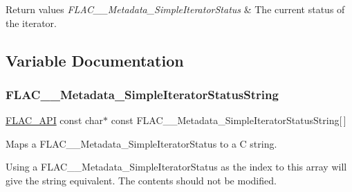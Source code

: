 \begin{DoxyRetVals}{Return values}
{\em F\+L\+A\+C\+\_\+\+\_\+\+Metadata\+\_\+\+Simple\+Iterator\+Status} & The current status of the iterator. \\
\hline
\end{DoxyRetVals}


\subsection{Variable Documentation}
\mbox{\label{group__flac__metadata__level1_ga28ea4a13fcbe97a732fafb13417036bb}} 
\subsubsection{\texorpdfstring{FLAC\_\_Metadata\_SimpleIteratorStatusString}{FLAC\_\_Metadata\_SimpleIteratorStatusString}}
{\footnotesize\ttfamily \mbox{\hyperlink{group__flac__export_ga56ca07df8a23310707732b1c0007d6f5}{F\+L\+A\+C\+\_\+\+A\+PI}} const char$\ast$ const F\+L\+A\+C\+\_\+\+\_\+\+Metadata\+\_\+\+Simple\+Iterator\+Status\+String\mbox{[}$\,$\mbox{]}}

Maps a F\+L\+A\+C\+\_\+\+\_\+\+Metadata\+\_\+\+Simple\+Iterator\+Status to a C string.

Using a F\+L\+A\+C\+\_\+\+\_\+\+Metadata\+\_\+\+Simple\+Iterator\+Status as the index to this array will give the string equivalent. The contents should not be modified. 